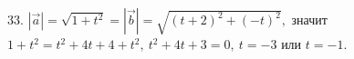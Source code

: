 33. $|\vec{a}|=\sqrt{1+t^2}=|\vec{b}|=\sqrt{(t+2)^2+(-t)^2},$ значит $1+t^2=t^2+4t+4+t^2,\ t^2+4t+3=0,\ t=-3$ или $t=-1.$\\
